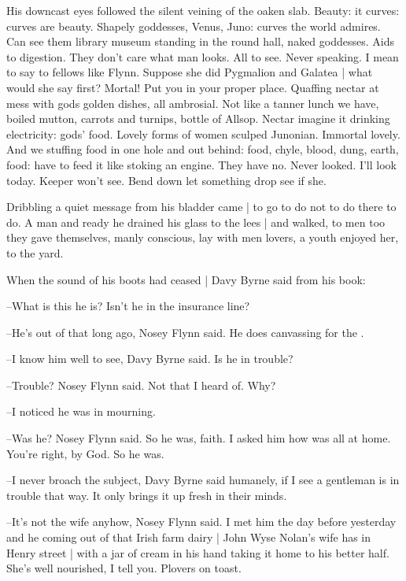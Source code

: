 His downcast eyes followed the silent veining of the oaken slab.
Beauty:
it curves:
curves are beauty.
Shapely goddesses,
Venus, Juno:
curves the world admires.
Can see them library museum standing in the round hall,
naked goddesses.
Aids to digestion.
They don't care what man looks.
All to see.
Never speaking.
I mean to say to fellows like Flynn.
Suppose she did Pygmalion and Galatea |
what would she say first?
Mortal!
Put you in your proper place.
Quaffing nectar at mess with gods golden dishes,
all ambrosial.
Not like a tanner lunch we have,
boiled mutton, carrots and turnips,
bottle of Allsop.
Nectar imagine it drinking electricity:
gods' food.
Lovely forms of women sculped Junonian.
Immortal lovely.
And we stuffing food in one hole and out behind:
food, chyle, blood, dung, earth, food:
have to feed it like stoking an engine.
They have no.
Never looked.
I'll look today.
Keeper won't see.
Bend down let something drop
see if she.

Dribbling a quiet message from his bladder came |
to go to do not to do there to do.
A man and ready he drained his glass to the lees |
and walked,
to men too they gave themselves,
manly conscious,
lay with men lovers,
a youth enjoyed her,
to the yard.

When the sound of his boots had ceased |
Davy Byrne said from his book:

--What is this he is?
Isn't he in the insurance line?

--He's out of that long ago,
Nosey Flynn said.
He does canvassing for the .

--I know him well to see,
Davy Byrne said.
Is he in trouble?

--Trouble?
Nosey Flynn said.
Not that I heard of.
Why?

--I noticed he was in mourning.

--Was he?
Nosey Flynn said.
So he was, faith.
I asked him how was all at home.
You're right, by God.
So he was.

--I never broach the subject,
Davy Byrne said humanely,
if I see a gentleman is in trouble that way.
It only brings it up fresh in their minds.

--It's not the wife anyhow,
Nosey Flynn said.
I met him the day before yesterday
and he coming out of that Irish farm dairy |
John Wyse Nolan's wife has in Henry street |
with a jar of cream in his hand taking it home to his better half.
She's well nourished, I tell you.
Plovers on toast.

